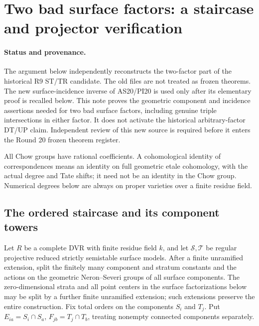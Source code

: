 \section{Two bad surface factors: a staircase and projector verification}
\label{r20px:section}

\paragraph{Status and provenance.}
The argument below independently reconstructs the two-factor part of
the historical R9 ST/TR candidate. The old files are not treated as
frozen theorems. The new surface-incidence inverse of AS20/PI20 is used
only after its elementary proof is recalled below. This note proves
the geometric component and incidence assertions needed for two bad
surface factors, including genuine triple intersections in either
factor. It does not activate the historical arbitrary-factor DT/UP
claim. Independent review of this new source is required before it
enters the Round 20 frozen theorem register.

All Chow groups have rational coefficients. A cohomological identity
of correspondences means an identity on full geometric etale
cohomology, with the actual degree and Tate shifts; it need not be an
identity in the Chow group. Numerical degrees below are always on
proper varieties over a finite residue field.

\subsection{The ordered staircase and its component towers}

Let $R$ be a complete DVR with finite residue field $k$, and let
$\mathcal S,\mathcal T$ be regular projective reduced strictly
semistable surface models. After a finite unramified extension, split
the finitely many component and stratum constants and the actions on
the geometric Neron--Severi groups of all surface components.
The zero-dimensional strata and all point centers in the surface
factorizations below may be split by a further finite unramified
extension; such extensions preserve the entire construction.
Fix total orders
on the components $S_i$ and $T_j$. Put
$E_{ia}=S_i\cap S_a$, $F_{jb}=T_j\cap T_b$, treating nonempty
connected components separately.


